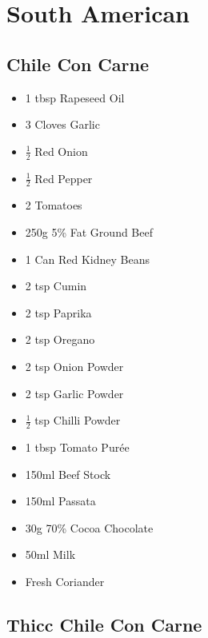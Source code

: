 \documentclass[11pt, english]{article}
\begin{document}
\newpage

\section{South American}

	\subsection{Chile Con Carne}

	\begin{itemize}
	\setlength\itemsep{0cm}
		\item 1 tbsp Rapeseed Oil
		\item 3 Cloves Garlic
		\item $\frac{1}{2}$ Red Onion
		\item $\frac{1}{2}$ Red Pepper
		\item 2 Tomatoes
		\item 250g 5\% Fat Ground Beef
		\item 1 Can Red Kidney Beans
		\item 2 tsp Cumin
		\item 2 tsp Paprika
		\item 2 tsp Oregano
		\item 2 tsp Onion Powder
		\item 2 tsp Garlic Powder
		\item $\frac{1}{2}$ tsp Chilli Powder
		\item 1 tbsp Tomato Pur\'{e}e
		\item 150ml Beef Stock
		\item 150ml Passata
		\item 30g 70\% Cocoa Chocolate
		\item 50ml Milk
		\item Fresh Coriander
	\end{itemize}

\newpage
	
	\subsection{Thicc Chile Con Carne}
\end{document}
